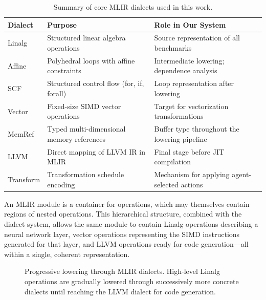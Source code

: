 \begin{table}[H]
    \centering
    \caption{Summary of core MLIR dialects used in this work.}
    \label{tab:mlir-dialects}
    \begin{tabularx}{\textwidth}{l >{\raggedright\arraybackslash}p{5cm} >{\raggedright\arraybackslash}p{5cm}}
        \toprule
        \textbf{Dialect} & \textbf{Purpose} & \textbf{Role in Our System} \\
        \midrule
        Linalg & Structured linear algebra operations & Source representation of all benchmarks \\
        \addlinespace
        Affine & Polyhedral loops with affine constraints & Intermediate lowering; dependence analysis \\
        \addlinespace
        SCF & Structured control flow (for, if, forall) & Loop representation after lowering \\
        \addlinespace
        Vector & Fixed-size SIMD vector operations & Target for vectorization transformations \\
        \addlinespace
        MemRef & Typed multi-dimensional memory references & Buffer type throughout the lowering pipeline \\
        \addlinespace
        LLVM & Direct mapping of LLVM IR in MLIR & Final stage before JIT compilation \\
        \addlinespace
        Transform & Transformation schedule encoding & Mechanism for applying agent-selected actions \\
        \bottomrule
    \end{tabularx}
\end{table}

An MLIR module is a container for operations, which may themselves contain regions of nested operations. This hierarchical structure, combined with the dialect system, allows the same module to contain Linalg operations describing a neural network layer, vector operations representing the SIMD instructions generated for that layer, and LLVM operations ready for code generation—all within a single, coherent representation.

\begin{figure}[H]
    \centering
    \caption{Progressive lowering through MLIR dialects. High-level Linalg operations are gradually lowered through successively more concrete dialects until reaching the LLVM dialect for code generation.}
    \label{fig:mlir-dialect-stack}
\end{figure}

